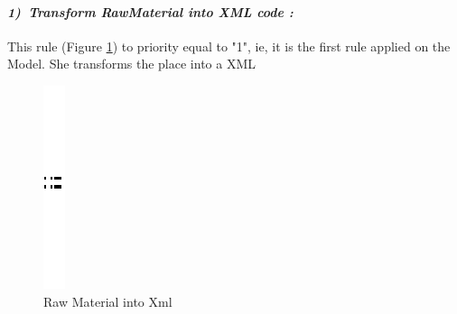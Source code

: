 \paragraph{\emph{1)~Transform RawMaterial into XML code :} }
This rule (Figure \ref{fig:Raw Material into Xml}) to priority equal to "1", ie, 
it is the first rule applied on the Model. She transforms the place into a XML

\begin{figure}[th]
\centering

\quad{}
\includegraphics{ch3/img/sep}
\quad{}
 
 
\caption{\label{fig:Raw Material into Xml}Raw Material into Xml} 

\end{figure} 

